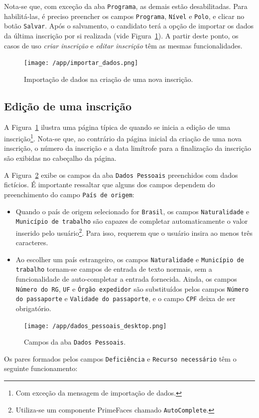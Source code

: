 \documentclass[
  10.5pt,				  %
	openright,			%
	twoside,			  %
  a5paper,
  chapter=TITLE,	%
	section=TITLE,	%
  hyphens,        %
	english,        %
	brazil          %
]{abntex2}
\begin{document}
Nota-se que, com exceção da aba \texttt{Programa}, as demais estão desabilitadas. Para habilitá-las, é preciso preencher os campos \texttt{Programa}, \texttt{Nível} e \texttt{Polo}, e clicar no botão \texttt{Salvar}. Após o salvamento, o candidato terá a opção de importar os dados da última inscrição por si realizada (vide Figura~\ref{fig:importar_dados}). A partir deste ponto, os casos de uso \emph{criar inscrição} e \emph{editar inscrição} têm as mesmas funcionalidades.


\begin{figure}[!ht]
  \caption{\label{fig:importar_dados} Importação de dados na criação de uma nova inscrição.}
  \begin{center}
    \texttt{[image: /app/importar\_dados.png]}
  \end{center}
\end{figure}


\subsection{Edição de uma inscrição}\label{sec:edicao_inscricao}

A Figura~\ref{fig:importar_dados} ilustra uma página típica de quando se inicia a edição de uma inscrição\footnote{Com exceção da mensagem de importação de dados.}. Nota-se que, ao contrário da página inicial da criação de uma nova inscrição, o número da inscrição e a data limítrofe para a finalização da inscrição são exibidas no cabeçalho da página.

A Figura~\ref{fig:dados_pessoais_desktop} exibe os campos da aba \texttt{Dados Pessoais} preenchidos com dados fictícios. É importante ressaltar que alguns dos campos dependem do preenchimento do campo \texttt{País de origem}:
\begin{itemize}
  \item Quando o país de origem selecionado for \texttt{Brasil}, os campos \texttt{Naturalidade} e \texttt{Município de trabalho} são capazes de completar automaticamente o valor inserido pelo usuário\footnote{Utiliza-se um componente PrimeFaces chamado \texttt{AutoComplete}.}. Para isso, requerem que o usuário insira ao menos três caracteres.
  \item Ao escolher um país estrangeiro, os campos \texttt{Naturalidade} e \texttt{Município de trabalho} tornam-se campos de entrada de texto normais, sem a funcionalidade de auto-completar a entrada fornecida. Ainda, os campos \texttt{Número do RG}, \texttt{UF} e \texttt{Órgão expedidor} são substituídos pelos campos \texttt{Número do passaporte} e \texttt{Validade do passaporte}, e o campo \texttt{CPF} deixa de ser obrigatório.
\end{itemize}
%
\begin{figure}[!ht]
  \caption{\label{fig:dados_pessoais_desktop} Campos da aba \texttt{Dados Pessoais}.}
  \begin{center}
    \texttt{[image: /app/dados\_pessoais\_desktop.png]}
  \end{center}
\end{figure}
%
Os pares formados pelos campos \texttt{Deficiência} e \texttt{Recurso necessário} têm o seguinte funcionamento: 
\end{document}
